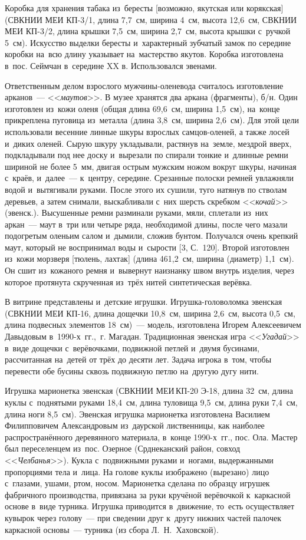 Коробка для хранения табака из~бересты [возможно, якутская или корякская] (СВКНИИ МЕИ КП-3/1, длина 7,7~см, ширина 4~см, высота 12,6~см, СВКНИИ МЕИ КП-3/2, длина крышки 7,5~см, ширина 2,7~см, высота крышки с~ручкой 5~см). Искусство выделки бересты и~характерный зубчатый замок по середине коробки на~всю длину указывает на~мастерство якутов. Коробка изготовлена в~пос. Сеймчан в~середине XX в. Использовался эвенами.

Ответственным делом взрослого мужчины-оленевода считалось изготовление арканов~--- <<\textit{маутов}>>. В музее хранятся два аркана (фрагменты), б/н. Один изготовлен из~кожи оленя (общая длина 69,6~см, ширина 1,5~см), на~конце прикреплена пуговица из~металла (длина 3,8~см, ширина 2,6~см). Для этой цели использовали весенние линные шкуры взрослых самцов-оленей, а также лосей и~диких оленей. Сырую шкуру укладывали, растянув на~земле, мездрой вверх, подкладывали под нее доску и~вырезали по спирали тонкие и~длинные ремни шириной не более 5~мм, двигая острым мужским ножом вокруг шкуры, начиная с~краёв, и~далее~--- к~центру, середине. Срезанные полоски ремней увлажняли водой и~вытягивали руками. После этого их сушили, туго натянув по стволам деревьев, а затем снимали, выскабливали с~них шерсть скребком <<\textit{кочай}>> (эвенск.). Высушенные ремни разминали руками, мяли, сплетали из~них аркан~--- маут в~три или четыре ряда, необходимой длины, после чего мазали подогретым оленьим салом и~дымили, сложив бунтом. Получался очень крепкий маут, который не воспринимал воды и~сырости [3, С.~120]. Второй изготовлен из~кожи морзверя [тюлень, лахтак] (длина 461,2~см, ширина (диаметр) 1,1~см). Он сшит из~кожаного ремня и~вывернут наизнанку швом внутрь изделия, через которое протянута скрученная из~трёх нитей синтетическая верёвка.

В витрине представлены и~детские игрушки. Игрушка-головоломка эвенская (СВКНИИ МЕИ КП-16, длина дощечки 10,8~см, ширина 2,6~см, высота 0,5~см, длина подвесных элементов 18~см)~--- модель, изготовлена Игорем Алексеевичем Давыдовым в~1990-х~гг.,~г. Магадан. Традиционная эвенская игра <<\textit{Угадай}>> в~виде дощечки с~верёвочками, подвижной петлей и~двумя бусинами, рассчитанная на~детей от трёх до десяти лет. Задача игрока в~том, чтобы перевести обе бусины сквозь подвижную петлю на~другую дугу нити.

Игрушка марионетка эвенская (СВКНИИ МЕИ\,КП-20 Э-18, длина 32~см, длина куклы с~поднятыми руками 18,4~см, длина туловища 9,5~см, длина руки 7,4~см, длина ноги 8,5~см). Эвенская игрушка марионетка изготовлена Василием Филипповичем Александровым из~даурской лиственницы, как наиболее распространённого деревянного материала, в~конце 1990-х~гг., пос. Ола. Мастер был переселенцем из~пос. Озерное (Срднеканский район, совход <<\textit{Челбанья}>>). Кукла с~подвижными руками и~ногами, выдержанными пропорциями тела и~лица. На голове куклы изображено (вырезано) лицо с~глазами, ушами, ртом, носом. Марионетка сделана по образцу игрушек фабричного производства, привязана за руки кручёной верёвочкой к~каркасной основе в~виде турника. Игрушка приводится в~движение, то~есть осуществляет кувырок через голову~--- при сведении друг к~другу нижних частей палочек каркасной основы~--- турника (из сбора Л.~Н.~Хаховской).

